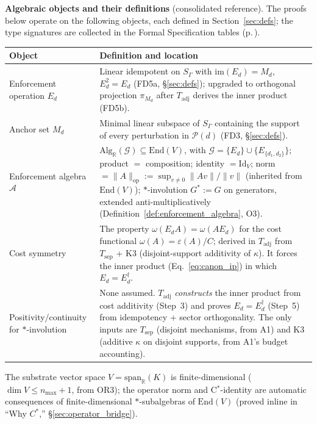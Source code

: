 \documentclass[11pt]{article}
\theoremstyle{remark}
\begin{document}
\smallskip\noindent\textbf{Algebraic objects and their definitions} (consolidated reference).  The proofs below operate on the following objects, each defined in Section~\ref{sec:defs}; the type signatures are collected in the Formal Specification tables (p.\,\pageref{box:formal_spec}).

\smallskip
\begin{tabular}{@{}p{3.0cm}p{9.5cm}@{}}
\textbf{Object} & \textbf{Definition and location} \\[2pt]
\hline\noalign{\smallskip}
Enforcement operation $E_d$ & Linear idempotent on $S_\Gamma$ with $\mathrm{im}(E_d) = M_d$, $E_d^2 = E_d$ (FD5a, \S\ref{sec:defs}); upgraded to orthogonal projection $\pi_{M_d}$ after $T_{\mathrm{adj}}$ derives the inner product (FD5b). \\[4pt]
Anchor set $M_d$ & Minimal linear subspace of $S_\Gamma$ containing the support of every perturbation in $\mathcal{P}(d)$ (FD3, \S\ref{sec:defs}). \\[4pt]
Enforcement algebra $\mathcal{A}$ & $\mathrm{Alg}_\mathbb{R}(\mathcal{G}) \subseteq \mathrm{End}(V)$, with $\mathcal{G} = \{E_d\} \cup \{E_{\{d_1,d_2\}}\}$; product $=$ composition; identity $= \mathrm{Id}_V$; norm $= \|A\|_{\mathrm{op}} := \sup_{v \ne 0}\|Av\|/\|v\|$ (inherited from $\mathrm{End}(V)$); $*$-involution $G^* := G$ on generators, extended anti-multiplicatively (Definition~\ref{def:enforcement_algebra}, O3). \\[4pt]
Cost symmetry & The property $\omega(E_d A) = \omega(A E_d)$ for the cost functional $\omega(A) = \varepsilon(A)/C$; derived in $T_{\mathrm{adj}}$ from $T_{\mathrm{sep}}$ + K3 (disjoint-support additivity of $\kappa$).  It forces the inner product (Eq.~\ref{eq:canon_ip}) in which $E_d = E_d^\dagger$. \\[4pt]
Positivity/continuity for $*$-involution & None assumed.  $T_{\mathrm{adj}}$ \emph{constructs} the inner product from cost additivity (Step~3) and proves $E_d = E_d^\dagger$ (Step~5) from idempotency + sector orthogonality.  The only inputs are $T_{\mathrm{sep}}$ (disjoint mechanisms, from A1) and K3 (additive $\kappa$ on disjoint supports, from A1's budget accounting). \\
\end{tabular}

\smallskip\noindent The substrate vector space $V = \mathrm{span}_\mathbb{R}(K)$ is finite-dimensional ($\dim V \le n_{\max} + 1$, from OR3); the operator norm and C$^*$-identity are automatic consequences of finite-dimensional $*$-subalgebras of $\mathrm{End}(V)$ (proved inline in ``Why $C^*$,'' \S\ref{sec:operator_bridge}).
\end{document}

